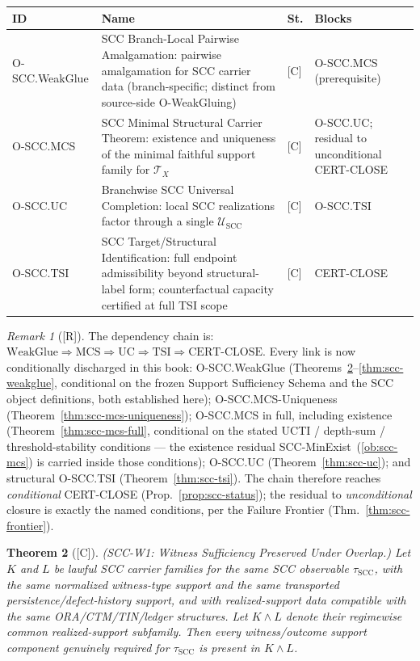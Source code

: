 \documentclass[12pt,oneside]{amsbook}
\theoremstyle{plain}
\newtheorem{theorem}{Theorem}[section]
\theoremstyle{definition}
\theoremstyle{remark}
\newtheorem{remark}[theorem]{Remark}
\newcommand{\status}[1]{\textup{[#1]}}
\begin{document}
\medskip
\renewcommand{\arraystretch}{1.4}
\noindent
\begin{tabular}{@{}p{2.2cm}p{5.0cm}p{1.0cm}p{3.5cm}@{}}
\hline
\textbf{ID} & \textbf{Name} & \textbf{St.} & \textbf{Blocks} \\
\hline
O-SCC.WeakGlue & SCC Branch-Local Pairwise Amalgamation:
 pairwise amalgamation for SCC carrier data (branch-specific;
 distinct from source-side O-WeakGluing) & [C] &
 O-SCC.MCS (prerequisite) \\
O-SCC.MCS & SCC Minimal Structural Carrier Theorem:
 existence and uniqueness of the minimal faithful support
 family for $\mathcal{T}_X$ & [C] &
 O-SCC.UC; residual to unconditional CERT-CLOSE \\
O-SCC.UC & Branchwise SCC Universal Completion:
 local SCC realizations factor through a single
 $\mathcal{U}_{\mathrm{SCC}}$ & [C] &
 O-SCC.TSI \\
O-SCC.TSI & SCC Target/Structural Identification:
 full endpoint admissibility beyond structural-label form;
 counterfactual capacity certified at full TSI scope & [C] &
 CERT-CLOSE \\
\hline
\end{tabular}
\renewcommand{\arraystretch}{1}

\medskip

\begin{remark}[\status{R}]
The dependency chain is:
$\mathrm{WeakGlue} \Rightarrow \mathrm{MCS} \Rightarrow
\mathrm{UC} \Rightarrow \mathrm{TSI} \Rightarrow \mathrm{CERT\text{-}CLOSE}$.
Every link is now conditionally discharged in this book:
O-SCC.WeakGlue (Theorems~\ref{thm:scc-w1}--\ref{thm:scc-weakglue},
conditional on the frozen Support Sufficiency Schema and the SCC
object definitions, both established here);
O-SCC.MCS-Uniqueness (Theorem~\ref{thm:scc-mcs-uniqueness});
O-SCC.MCS in full, including existence
(Theorem~\ref{thm:scc-mcs-full}, conditional on the stated UCTI /
depth-sum / threshold-stability conditions --- the existence residual
SCC-MinExist~(\ref{ob:scc-mcs}) is carried inside those conditions);
O-SCC.UC (Theorem~\ref{thm:scc-uc}); and structural O-SCC.TSI
(Theorem~\ref{thm:scc-tsi}). The chain therefore reaches
\emph{conditional} CERT-CLOSE (Prop.~\ref{prop:scc-status}); the
residual to \emph{unconditional} closure is exactly the named
conditions, per the Failure Frontier
(Thm.~\ref{thm:scc-frontier}).
\end{remark}


\begin{theorem}[\status{C}]\label{thm:scc-w1}
\textup{(SCC-W1: Witness Sufficiency Preserved Under Overlap.)}
Let $K$ and $L$ be lawful SCC carrier families for the same SCC
observable $\tau_{\mathrm{SCC}}$, with the same normalized
witness-type support and the same transported persistence/defect-history
support, and with realized-support data compatible with the same
ORA/CTM/TIN/ledger structures. Let $K \wedge L$ denote their
regimewise common realized-support subfamily. Then every
witness/outcome support component genuinely required for
$\tau_{\mathrm{SCC}}$ is present in $K \wedge L$.
\end{theorem}
\end{document}
